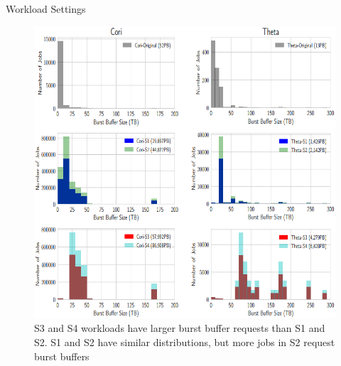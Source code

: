 \documentclass[aspectratio=1610]{beamer}
\begin{document}
\begin{frame}{Workload Settings}
\begin{figure}
    \centering
    \includegraphics[scale=0.47]{pic/workload_reset.png}
    \caption{S3 and S4 workloads have larger burst buffer requests than S1 and S2. S1 and S2 have similar distributions, but more jobs in S2 request burst
    buffers}
    \label{fig:my_label}
\end{figure}    
\end{frame}
\end{document}
